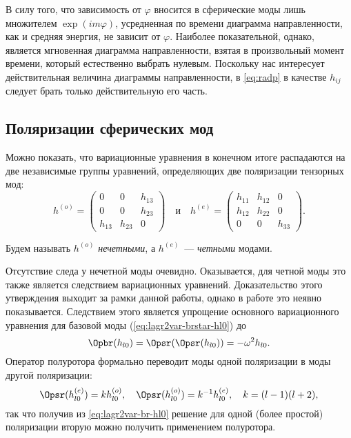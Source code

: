 \documentclass[\docroot/reports/draft/report.tex]{subfiles}
\begin{document}
    В силу того, что зависимость от $\varphi$ вносится в сферические моды лишь множителем $\exp(im\varphi)$, усредненная по времени диаграмма направленности, как и средняя энергия, не зависит от $\varphi$. Наиболее показательной, однако, является мгновенная диаграмма направленности, взятая в произвольный момент времени, который естественно выбрать нулевым. Поскольку нас интересует действительная величина диаграммы направленности, в \autoref{eq:radp} в качестве $h_{ij}$ следует брать только действительную его часть.

\subsection{Поляризации сферических мод}

    Можно показать, что вариационные уравнения в конечном итоге распадаются на две независимые группы уравнений, определяющих две поляризации тензорных мод:
    \begin{equation}
        h^{(o)} = \begin{pmatrix}0&0&h_{13}\\0&0&h_{23}\\h_{13}&h_{23}&0\end{pmatrix} \quad\text{и}\quad
        h^{(e)} = \begin{pmatrix}h_{11}&h_{12}&0\\h_{12}&h_{22}&0\\0&0&h_{33}\end{pmatrix} .
    \end{equation}

    Будем называть $h^{(o)}$ \textit{нечетными}, а $h^{(e)}$~--- \textit{четными} модами.

    Отсутствие следа у нечетной моды очевидно. Оказывается, для четной моды это также является следствием вариационных уравнений. Доказательство этого утверждения выходит за рамки данной работы, однако в работе  это неявно показывается. Следствием этого является упрощение основного вариационного уравнения для базовой моды (\autoref{eq:lagr2var-brstar-hl0}) до
    \begin{equation}\label{eq:lagr2var-br-hl0}
        \Opbr(h_{l0}) = \Opsr(\Opsr(h_{l0})) = - \omega^2 h_{l0} .
    \end{equation}
    Оператор полуротора формально переводит моды одной поляризации в моды другой поляризации:
    \begin{equation}\label{eq:sr-he-ho}
        \Opsr(h_{l0}^{(e)}) = k h_{l0}^{(o)}, \quad \Opsr(h_{l0}^{(o)}) = k^{-1} h_{l0}^{(e)}, \quad k = (l-1)(l+2) ,
    \end{equation}
    так что получив из \autoref{eq:lagr2var-br-hl0} решение для одной (более простой) поляризации вторую можно получить применением полуротора.
\end{document}
